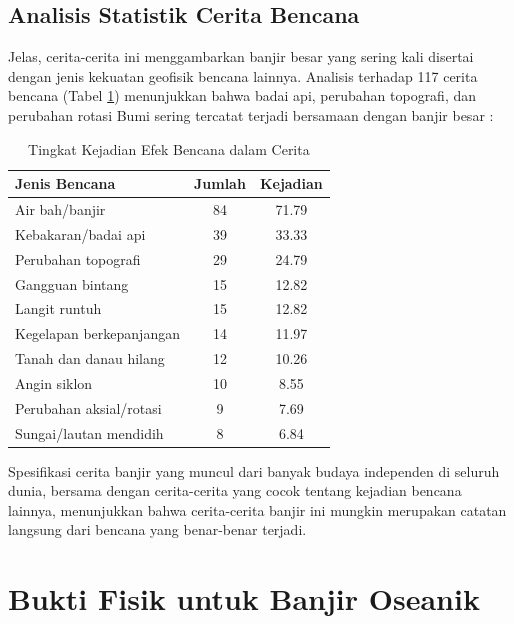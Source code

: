 \documentclass[10pt,twocolumn,letterpaper]{article}
\begin{document}
\subsection{Analisis Statistik Cerita Bencana}

Jelas, cerita-cerita ini menggambarkan banjir besar yang sering kali disertai dengan jenis kekuatan geofisik bencana lainnya. Analisis terhadap 117 cerita bencana (Tabel \ref{tab: 1}) menunjukkan bahwa badai api, perubahan topografi, dan perubahan rotasi Bumi sering tercatat terjadi bersamaan dengan banjir besar \cite{14}:

\begin{table}[ht]
\begin{center}
\renewcommand{\arraystretch}{1.2}  %
\begin{tabular}{|l|c|c|}
\hline
\textbf{Jenis Bencana} & \textbf{Jumlah} & \textbf{Kejadian} \\
\hline\hline
Air bah/banjir        & 84 & 71.79 \\
Kebakaran/badai api   & 39 & 33.33 \\
Perubahan topografi   & 29 & 24.79 \\
Gangguan bintang      & 15 & 12.82 \\
Langit runtuh         & 15 & 12.82 \\
Kegelapan berkepanjangan & 14 & 11.97 \\
Tanah dan danau hilang & 12 & 10.26 \\
Angin siklon          & 10 & 8.55  \\
Perubahan aksial/rotasi & 9 & 7.69  \\
Sungai/lautan mendidih & 8 & 6.84 \\
\hline
\end{tabular}
\end{center}
\caption{Tingkat Kejadian Efek Bencana dalam Cerita}
\label{tab: 1}
\end{table}

Spesifikasi cerita banjir yang muncul dari banyak budaya independen di seluruh dunia, bersama dengan cerita-cerita yang cocok tentang kejadian bencana lainnya, menunjukkan bahwa cerita-cerita banjir ini mungkin merupakan catatan langsung dari bencana yang benar-benar terjadi.

\section{Bukti Fisik untuk Banjir Oseanik}
\end{document}
